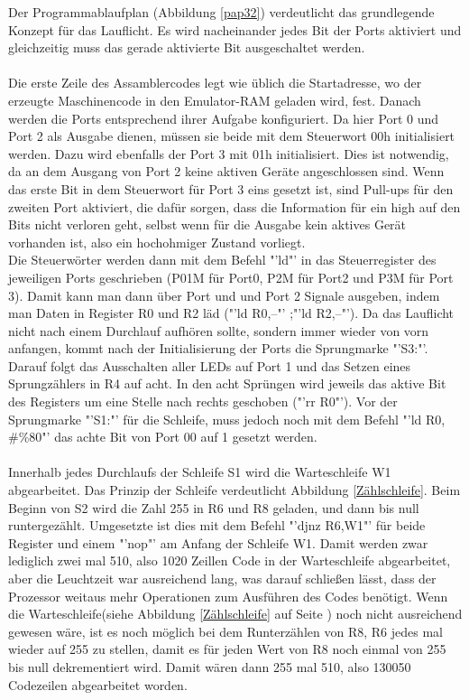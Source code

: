 Der Programmablaufplan (Abbildung \ref{pap32}) verdeutlicht das grundlegende Konzept für das Lauflicht. Es wird nacheinander jedes Bit der Ports aktiviert und gleichzeitig muss das gerade aktivierte Bit ausgeschaltet werden. \\\\
Die erste Zeile des Assamblercodes legt wie üblich die Startadresse, wo der erzeugte Maschinencode in den Emulator-RAM geladen wird, fest. Danach werden die Ports entsprechend ihrer Aufgabe konfiguriert. Da hier Port 0 und Port 2 als Ausgabe dienen, müssen sie beide mit dem Steuerwort 00h initialisiert werden. Dazu wird ebenfalls der Port 3 mit 01h initialisiert. Dies ist notwendig, da an dem Ausgang von Port 2 keine aktiven Geräte angeschlossen sind. Wenn das erste Bit in dem Steuerwort für Port 3 eins gesetzt ist, sind Pull-ups für den zweiten Port aktiviert, die dafür sorgen, dass die Information für ein high auf den Bits nicht verloren geht, selbst wenn für die Ausgabe kein aktives Gerät vorhanden ist, also ein hochohmiger Zustand vorliegt.\\
Die Steuerwörter werden dann mit dem Befehl "'ld"' in das Steuerregister des jeweiligen Ports geschrieben (P01M für Port0, P2M für Port2 und P3M für Port 3). Damit kann man dann über Port und und Port 2 Signale ausgeben, indem man Daten in Register R0 und R2 läd ("'ld R0,--"' ;"'ld R2,--"'). Da das Lauflicht nicht nach einem Durchlauf aufhören sollte, sondern immer wieder von vorn anfangen, kommt nach der Initialisierung der Ports die Sprungmarke "'S3:"'. Darauf folgt das Ausschalten aller LEDs auf Port 1 und das Setzen eines Sprungzählers in R4 auf acht. In den acht Sprüngen wird jeweils das aktive Bit des Registers um eine Stelle nach rechts geschoben ("'rr R0"'). Vor der Sprungmarke "'S1:"' für die Schleife, muss jedoch noch mit dem Befehl "'ld R0,$\#\%80$"'  das achte Bit von Port 00 auf 1 gesetzt werden.\\\\

Innerhalb jedes Durchlaufs der Schleife S1 wird die Warteschleife W1 abgearbeitet. Das Prinzip der Schleife verdeutlicht Abbildung \ref{Zählschleife}. Beim Beginn von S2 wird die Zahl 255 in R6 und R8 geladen, und dann bis null runtergezählt. Umgesetzte ist dies mit dem Befehl "'djnz R6,W1"' für beide Register und einem "'nop"' am Anfang der Schleife W1. Damit werden zwar lediglich zwei mal 510, also 1020 Zeillen Code in der Warteschleife abgearbeitet, aber die Leuchtzeit war ausreichend lang, was darauf schließen lässt, dass der Prozessor weitaus mehr Operationen zum Ausführen des Codes benötigt. Wenn die Warteschleife(siehe Abbildung \ref{Zählschleife} auf Seite \pageref{Zählschleife}) noch nicht ausreichend gewesen wäre, ist es noch möglich bei dem Runterzählen von R8, R6 jedes mal wieder auf 255 zu stellen, damit es für jeden Wert von R8 noch einmal von 255 bis null dekrementiert wird. Damit wären dann 255 mal 510, also 130050 Codezeilen abgearbeitet worden.\\


